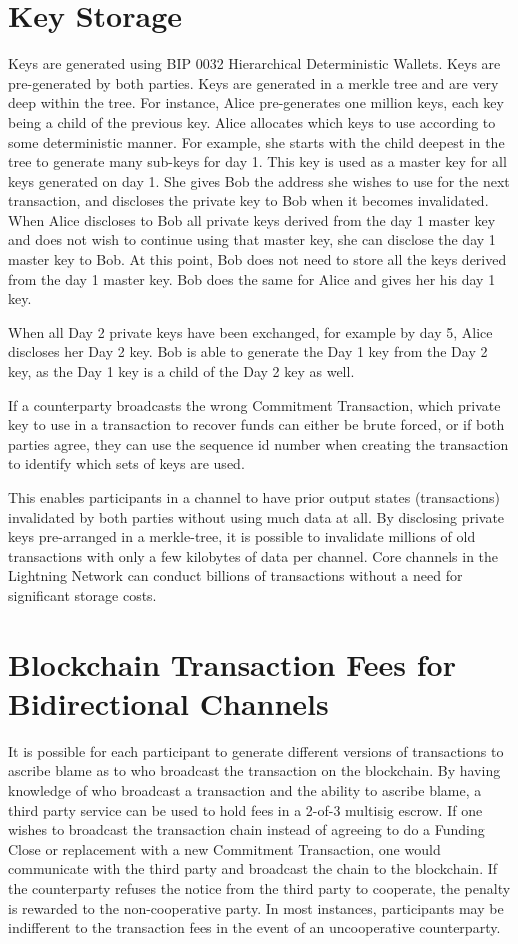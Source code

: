 \documentclass[letterpaper,11pt]{article}
\begin{document}
\section{Key Storage}

Keys are generated using BIP 0032 Hierarchical Deterministic
Wallets\cite{bip32}. Keys are pre-generated by both parties. Keys are generated
in a merkle tree and are very deep within the tree. For instance, Alice
pre-generates one million keys, each key being a child of the previous key.
Alice allocates which keys to use according to some deterministic manner. For
example, she starts with the child deepest in the tree to generate many sub-keys
for day 1. This key is used as a master key for all keys generated on day 1. She
gives Bob the address she wishes to use for the next transaction, and discloses
the private key to Bob when it becomes invalidated. When Alice discloses to Bob
all private keys derived from the day 1 master key and does not wish to continue
using that master key, she can disclose the day 1 master key to Bob. At this
point, Bob does not need to store all the keys derived from the day 1 master
key. Bob does the same for Alice and gives her his day 1 key.

When all Day 2 private keys have been exchanged, for example by day 5, Alice
discloses her Day 2 key. Bob is able to generate the Day 1 key from the Day 2
key, as the Day 1 key is a child of the Day 2 key as well.

If a counterparty broadcasts the wrong Commitment Transaction, which private
key to use in a transaction to recover funds can either be brute forced, or if
both parties agree, they can use the sequence id number when creating the
transaction to identify which sets of keys are used.

This enables participants in a channel to have prior output states
(transactions) invalidated by both parties without using much data at all. By
disclosing private keys pre-arranged in a merkle-tree, it is possible to
invalidate millions of old transactions with only a few kilobytes of data per
channel. Core channels in the Lightning Network can conduct billions of
transactions without a need for significant storage costs.

\section{Blockchain Transaction Fees for Bidirectional Channels}

It is possible for each participant to generate different versions of
transactions to ascribe blame as to who broadcast the transaction on the
blockchain. By having knowledge of who broadcast a transaction and the ability
to ascribe blame, a third party service can be used to hold fees in a 2-of-3
multisig escrow. If one wishes to broadcast the transaction chain instead of
agreeing to do a Funding Close or replacement with a new Commitment Transaction,
one would communicate with the third party and broadcast the chain to the
blockchain. If the counterparty refuses the notice from the third party to
cooperate, the penalty is rewarded to the non-cooperative party. In most
instances, participants may be indifferent to the transaction fees in the event
of an uncooperative counterparty.
\end{document}
